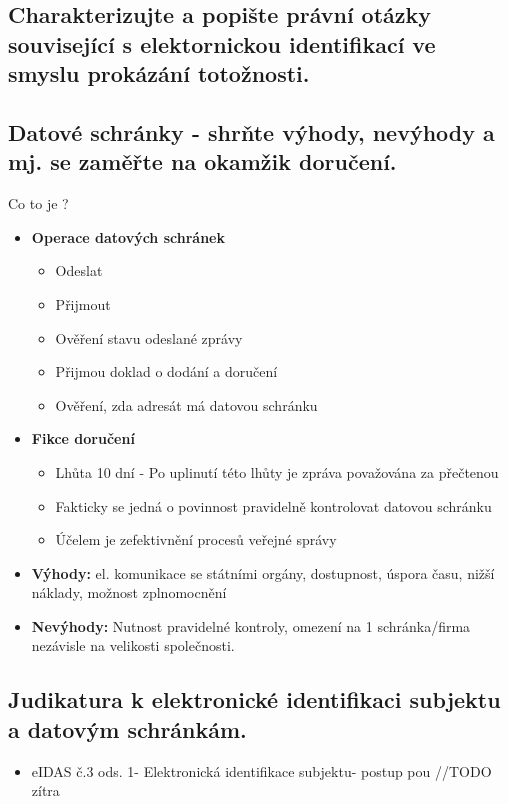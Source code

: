 \subsection{Charakterizujte a popište právní otázky související s elektornickou identifikací ve smyslu prokázání totožnosti.}


\subsection{Datové schránky - shrňte výhody, nevýhody a mj. se zaměřte na okamžik doručení.}
Co to je ?\begin{itemize}
    \begin{itemize}
        \item Podle nařízení eIDAS čl. 3 bod 38 služba, která umožňuje přenášet data mezi třetími osobami elektronickými prostředky a poskytuje důkazy týkající se nakládání s přenášenými daty včetně dokladu o odeslání a přijetí dat, které chrání přenášená data před rizikem ztráty, krádeže, nebo poškození
        \item Spolehlivý způsob komunikace s veřejnou správou 
        \item Fikce doručení - garantuje doručení
        \item Spravováno Ministerstvem vnitra
    \end{itemize}
\item\textbf{Operace datových schránek}
    \begin{itemize}
        \item Odeslat
        \item Přijmout
        \item Ověření stavu odeslané zprávy
        \item Přijmou doklad o dodání a doručení
        \item Ověření, zda adresát má datovou schránku
    \end{itemize}
\item\textbf{Fikce doručení}
    \begin{itemize}
        \item Lhůta 10 dní - Po uplinutí této lhůty je zpráva považována za přečtenou
        \item Fakticky se jedná o povinnost pravidelně kontrolovat datovou schránku
        \item Účelem je zefektivnění procesů veřejné správy
    \end{itemize}
\item \textbf{Výhody:} el. komunikace se státními orgány, dostupnost, úspora času, nižší náklady, možnost zplnomocnění
\item \textbf{Nevýhody:} Nutnost pravidelné kontroly, omezení na 1 schránka/firma nezávisle na velikosti společnosti.
\end{itemize}


\subsection{Judikatura k elektronické identifikaci subjektu a datovým schránkám.}
\begin{itemize}
    \item eIDAS č.3 ods. 1- Elektronická identifikace subjektu- postup pou
    //TODO zítra
\end{itemize}
